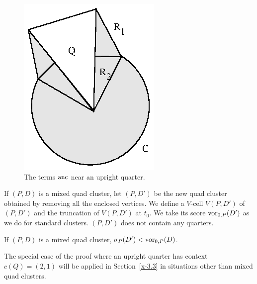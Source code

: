 \begin{figure}[htb]
  \centering
  \includegraphics{PS/diag46.ps}
  \caption{The terms $\operatorname{anc}$ near an upright quarter.}
  \label{fig:anchor-quarter:bis}
\end{figure}

\smallskip
If $(P,D)$ is a mixed quad cluster, let $(P,D')$ be the new quad
cluster obtained by removing all the enclosed vertices.  We define
a $V$-cell $V(P,D')$ of $(P,D')$ and the truncation of $V(P,D')$
at $t_0$. We take its score ${\operatorname{vor}}_{0,P}(D')$  as we do for
standard clusters.  $(P,D')$ does not contain any quarters.

\begin{lemma} \label{lemma:mixed-vor0}
If $(P,D)$ is a mixed quad cluster, $\sigma_P(D') <
\operatorname{vor}_{0,P}(D)$.
\end{lemma}

\begin{remark}
The special case of the proof where an upright quarter has context
$c(Q)=(2,1)$ will be applied in Section~\ref{x-3.3} in situations
other than mixed quad clusters.
\end{remark}

